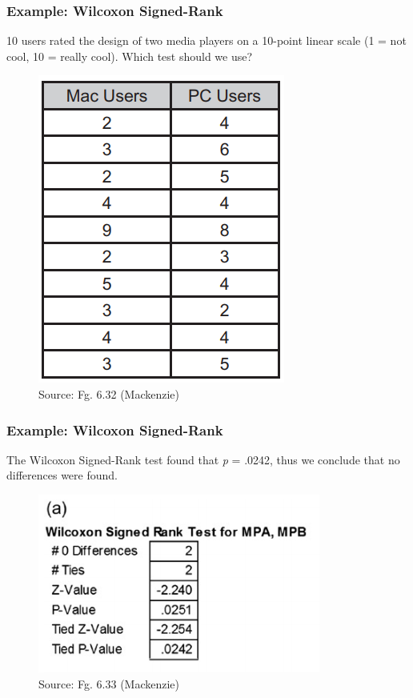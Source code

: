 \documentclass{beamer}
\begin{document}
\begin{frame}
	\frametitle{Example: Wilcoxon Signed-Rank} 
	10 users rated the design of two media players on a 10-point linear scale (1 = not cool, 10 = really cool).  Which test should we use?
	\begin{figure}
		\includegraphics[width=0.3\linewidth]{6-30}
		\caption{Source: Fg. 6.32 (Mackenzie)}
	\end{figure}
\end{frame}

\begin{frame}
	\frametitle{Example: Wilcoxon Signed-Rank} 
	The Wilcoxon Signed-Rank test found that \textit{p} = .0242, thus we conclude that no differences were found.
	\begin{figure}
		\includegraphics[width=0.6\linewidth]{6-33}
		\caption{Source: Fg. 6.33 (Mackenzie)}
	\end{figure}
\end{frame}
\end{document}
